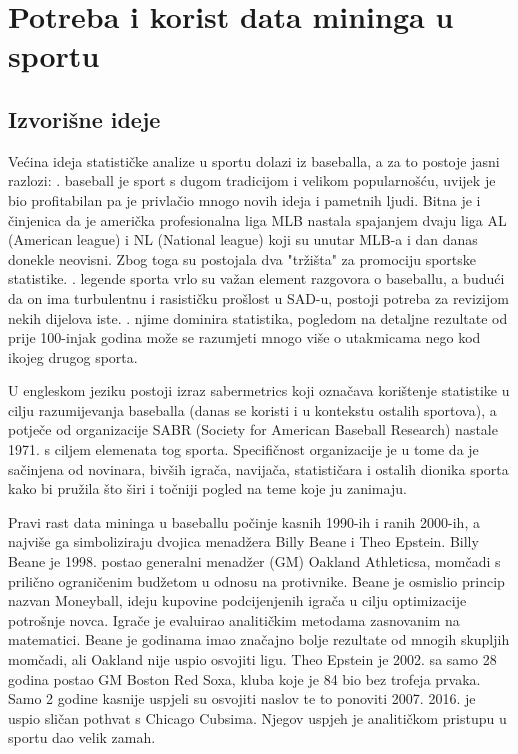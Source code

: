 \documentclass{ferseminar}
\begin{document}
\section{Potreba i korist data mininga u sportu}

\subsection{Izvorišne ideje}
Većina ideja statističke analize u sportu dolazi iz baseballa, a za to postoje jasni razlozi:
. baseball je sport s dugom tradicijom i velikom popularnošću, uvijek je bio profitabilan pa je privlačio mnogo novih ideja i pametnih ljudi. Bitna je i činjenica da je američka profesionalna liga MLB nastala spajanjem dvaju liga AL (American league) i NL (National league) koji su unutar MLB-a i dan danas donekle neovisni. Zbog toga su postojala dva "tržišta" za promociju sportske statistike.
. legende sporta vrlo su važan element razgovora o baseballu, a budući da on ima turbulentnu i rasističku prošlost u SAD-u, postoji potreba za revizijom nekih dijelova iste.
. njime dominira statistika, pogledom na detaljne rezultate od prije 100-injak godina može se razumjeti mnogo više o utakmicama nego kod ikojeg drugog sporta.
\newline

U engleskom jeziku postoji izraz sabermetrics koji označava korištenje statistike u cilju razumijevanja baseballa (danas se koristi i u kontekstu ostalih sportova), a potječe od organizacije SABR (Society for American Baseball Research) nastale 1971. s ciljem elemenata tog sporta. Specifičnost organizacije je u tome da je sačinjena od novinara, bivših igrača, navijača, statističara i ostalih dionika sporta kako bi pružila što širi i točniji pogled na teme koje ju zanimaju.

Pravi rast data mininga u baseballu počinje kasnih 1990-ih i ranih 2000-ih, a najviše ga simboliziraju dvojica menadžera Billy Beane i Theo Epstein. Billy Beane je 1998. postao generalni menadžer (GM) Oakland Athleticsa, momčadi s prilično ograničenim budžetom u odnosu na protivnike. Beane je osmislio princip nazvan Moneyball, ideju kupovine podcijenjenih igrača u cilju optimizacije potrošnje novca. Igrače je evaluirao analitičkim metodama zasnovanim na matematici. Beane je godinama imao značajno bolje rezultate od mnogih skupljih momčadi, ali Oakland nije uspio osvojiti ligu. Theo Epstein je 2002. sa samo 28 godina postao GM Boston Red Soxa, kluba koje je 84 bio bez trofeja prvaka. Samo 2 godine kasnije uspjeli su osvojiti naslov te to ponoviti 2007. 2016. je uspio sličan pothvat s Chicago Cubsima. Njegov uspjeh je analitičkom pristupu u sportu dao velik zamah.
\end{document}
